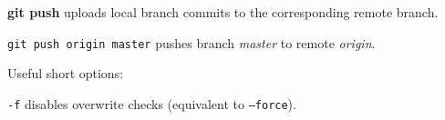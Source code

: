 %

\textbf{git push} uploads local branch commits to the corresponding remote branch.

\texttt{git push origin master} pushes branch \emph{master} to remote \emph{origin}.

Useful short options:
\begin{compactenum}
\item [\texttt{-f}] disables overwrite checks (equivalent to \texttt{--force}).
\end{compactenum}

%
